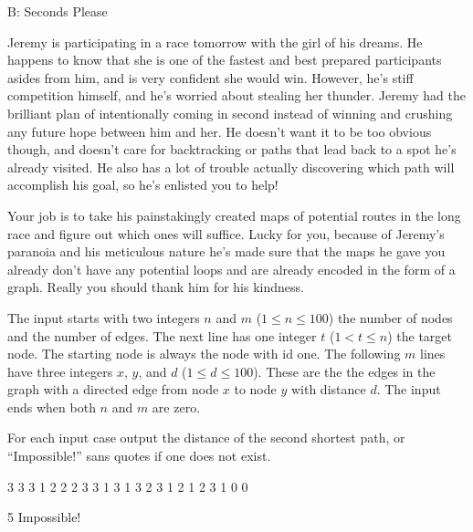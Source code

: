 \begin{problem}{B: Seconds Please}

Jeremy is participating in a race tomorrow with the girl of his dreams.
He happens to know that she is one of the fastest and best prepared participants asides from him, and is very confident she would win.
However, he's stiff competition himself, and he's worried about stealing her thunder.
Jeremy had the brilliant plan of intentionally coming in second instead of winning and crushing any future hope between him and her.
He doesn't want it to be too obvious though, and doesn't care for backtracking or paths that lead back to a spot he's already visited.
He also has a lot of trouble actually discovering which path will accomplish his goal, so he's enlisted you to help!

Your job is to take his painstakingly created maps of potential routes in the long race and figure out which ones will suffice.
Lucky for you, because of Jeremy's paranoia and his meticulous nature he's made sure that the maps he gave you already don't have any potential loops and are already encoded in the form of a graph.
Really you should thank him for his kindness.

\end{problem}

\begin{formalin}
The input starts with two integers $n$ and $m$ ($1 \leq n \leq 100$) the number of nodes and the number of edges.
The next line has one integer $t$ ($1 < t \leq n$) the target node.
The starting node is always the node with id one.
The following $m$ lines have three integers $x$, $y$, and $d$ ($1 \leq d \leq 100$).
These are the the edges in the graph with a directed edge from node $x$ to node $y$ with distance $d$.
The input ends when both $n$ and $m$ are zero.
\end{formalin}

\begin{formalout}
For each input case output the distance of the second shortest path, or ``Impossible!'' sans quotes if one does not exist.
\end{formalout}

\begin{datain}
3 3
3
1 2 2
2 3 3
1 3 1
3 2
3
1 2 1
2 3 1
0 0
\end{datain}

\begin{dataout}
5
Impossible!
\end{dataout}


